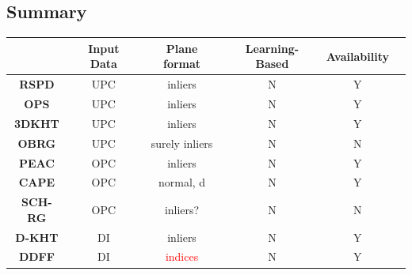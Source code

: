\documentclass[main.tex]{subfiles}
\begin{document}
\subsection*{Summary}
\begin{table}[!h]
    \centering
    \begin{tabular}{|c|c|c|c|c|c}
        \hline
                                                                         & \textbf{Input Data} & \textbf{Plane format}                 & \textbf{Learning-Based} & \textbf{Availability} \\ \hline
        \textbf{RSPD} \cite{Araújo_Oliveira_2020}                        & UPC                 & inliers                               & N                       & Y                     \\ \hline
        \textbf{OPS} \cite{Sun_Mordohai_2019}                            & UPC                 & inliers                               & N                       & Y                     \\ \hline
        \textbf{3DKHT} \cite{Limberger_Oliveira_2015}                    & UPC                 & inliers                               & N                       & Y                     \\ \hline
        \textbf{OBRG} \cite{Vo_Truong-Hong_Laefer_Bertolotto_2015}       & UPC                 & surely inliers                        & N                       & N                     \\ \hline
        \textbf{PEAC} \cite{Feng_Taguchi_Kamat_2014}                     & OPC                 & inliers                               & N                       & Y                     \\ \hline
        \textbf{CAPE} \cite{Proença_Gao_2018}                            & OPC                 & normal, d                             & N                       & Y                     \\ \hline
        \textbf{SCH-RG} \cite{Mols_Li_Hanebeck_2020}                     & OPC                 & inliers?                              & N                       & N                     \\ \hline
        \textbf{D-KHT}  \cite{Vera_Lucio_Fernandes_Velho_2018}           & DI                  & inliers                               & N                       & Y                     \\ \hline
        \textbf{DDFF} \cite{Roychoudhury_Missura_Bennewitz_2021}         & DI                  & \textcolor{red}{indices}              & N                       & Y                     \\ \hline

\end{tabular}
\end{table}
\end{document}

